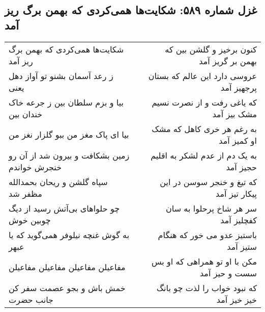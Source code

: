 \begin{center}
\section*{غزل شماره ۵۸۹: شکایت‌ها همی‌کردی که بهمن برگ ریز آمد}
\label{sec:0589}
\begin{longtable}{l p{0.5cm} r}
شکایت‌ها همی‌کردی که بهمن برگ ریز آمد
&&
کنون برخیز و گلشن بین که بهمن بر گریز آمد
\\
ز رعد آسمان بشنو تو آواز دهل یعنی
&&
عروسی دارد این عالم که بستان پرجهیز آمد
\\
بیا و بزم سلطان بین ز جرعه خاک خندان بین
&&
که یاغی رفت و از نصرت نسیم مشک بیز آمد
\\
بیا ای پاک مغز من ببو گلزار نغز من
&&
به رغم هر خری کاهل که مشک او کمیز آمد
\\
زمین بشکافت و بیرون شد از آن رو خنجرش خواندم
&&
به یک دم از عدم لشکر به اقلیم حجیز آمد
\\
سپاه گلشن و ریحان بحمدالله مظفر شد
&&
که تیغ و خنجر سوسن در این پیکار تیز آمد
\\
چو حلواهای بی‌آتش رسید از دیگ چوبین خوش
&&
سر هر شاخ پرحلوا به سان کفچلیز آمد
\\
به گوش غنچه نیلوفر همی‌گوید که یا عبهر
&&
باستیز عدو می خور که هنگام ستیز آمد
\\
مفاعیلن مفاعیلن مفاعیلن مفاعیلن
&&
مکن با او تو همراهی که او بس سست و حیز آمد
\\
خمش باش و بجو عصمت سفر کن جانب حضرت
&&
که نبود خواب را لذت چو بانگ خیز خیز آمد
\\
\end{longtable}
\end{center}
